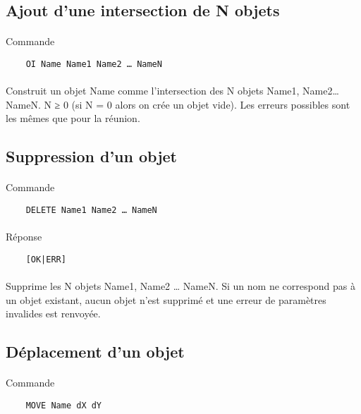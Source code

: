 \documentclass[a4paper, 12pts]{article}
\begin{document}
\subsection{Ajout d'une intersection de N objets}
 \paragraph{}
Commande
\begin{lstlisting}
	OI Name Name1 Name2 … NameN
\end{lstlisting}
\paragraph{}
Construit un objet Name comme l'intersection des N objets Name1, Name2… NameN. N ≥ 0 (si N = 0 alors on crée un objet vide). Les erreurs possibles sont les mêmes que pour la réunion.

\subsection{Suppression d'un objet}
 \paragraph{}
Commande
\begin{lstlisting}
	DELETE Name1 Name2 … NameN
\end{lstlisting}
\paragraph{}
Réponse
\begin{lstlisting}
	[OK|ERR]
\end{lstlisting}
\paragraph{}
Supprime les N objets Name1, Name2 … NameN. Si un nom ne correspond pas à un objet existant, aucun objet n'est supprimé et une erreur de paramètres invalides est renvoyée.

\subsection{Déplacement d'un objet}
 \paragraph{}
Commande
\begin{lstlisting}
	MOVE Name dX dY
\end{lstlisting}
\end{document}
